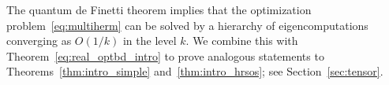 \documentclass[11pt]{article}
\numberwithin{theorem}{section}
\theoremstyle{definition}
\newcommand{\ip}[2]{\langle #1 , #2\rangle}
\newcommand{\I}{\mathds{1}}
\newcommand{\setft}[1]{\mathrm{#1}}
\newcommand{\real}{\mathbb{R}}
\newcommand\Sp{\mathcal{S}}
\newcommand{\Hom}{\setft{Hom}}
\def\ba#1\ea{\begin{align}#1\end{align}}
\begin{document}
The quantum de Finetti theorem implies that the optimization problem~\eqref{eq:multiherm} can be solved by a hierarchy of eigencomputations converging as $O(1/k)$ in the level $k$. We combine this with Theorem~\ref{eq:real_optbd_intro} to prove analogous statements to Theorems~\ref{thm:intro_simple} and~\ref{thm:intro_hrsos}; see Section~\ref{sec:tensor}.


\end{document}
